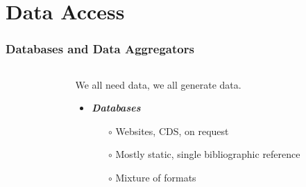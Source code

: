 \section{Data Access}
\label{sec:databases}

\begin{frame}
  \frametitle{Databases and Data Aggregators}

  \begin{columns}[T]

      \begin{column}{.3\textwidth}
      \end{column}


    \begin{column}{.7\textwidth}
      \begin{overlayarea}{\textwidth}{\textheight}
          \vspace{1em}
          We all need data, we all generate data.\\
          \vspace{1em}
          \begin{itemize}[<.->]
            \item \emph{\bf Databases}
              \begin{itemize}[<.->]
                \item[$\circ$] Websites, CDS, on request
                \item[$\circ$] Mostly static, single bibliographic reference
                \item[$\circ$] Mixture of formats
              \end{itemize}


\end{itemize}
\end{overlayarea}
\end{column}
\end{columns}
\end{frame}
